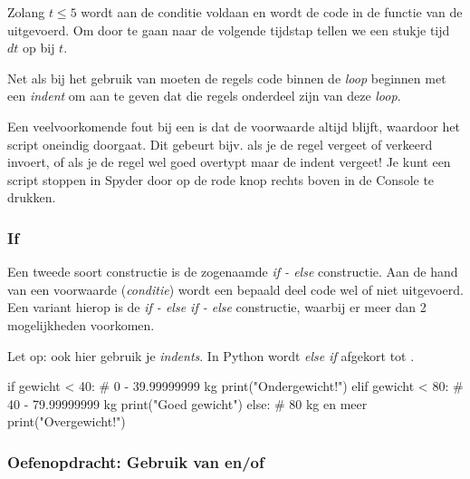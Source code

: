 \documentclass[a4paper,11pt, fleqn]{article}
\begin{document}
Zolang $t\le5$ wordt aan de conditie voldaan en wordt de code in de functie van de  uitgevoerd. Om door te gaan naar de volgende tijdstap tellen we een stukje tijd $dt$ op bij $t$. 

Net als bij het gebruik van  moeten de regels code binnen de  \textit{loop} beginnen met een \textit{indent} om aan te geven dat die regels onderdeel zijn van deze \textit{loop}.

Een veelvoorkomende fout bij een  is dat de voorwaarde altijd  blijft, waardoor het script oneindig doorgaat. Dit gebeurt bijv. als je de regel  vergeet of verkeerd invoert, of als je de regel wel goed overtypt maar de indent vergeet! Je kunt een script stoppen in Spyder door op de rode knop rechts boven in de Console te drukken.

\subsubsection{If}
Een tweede soort constructie is de zogenaamde \textit{if - else} constructie. Aan de hand van een voorwaarde (\textit{conditie}) wordt een bepaald deel code wel of niet uitgevoerd. Een variant hierop is de \textit{if - else if - else} constructie, waarbij er meer dan 2 mogelijkheden voorkomen. 

Let op: ook hier gebruik je \textit{indents}. In Python wordt \textit{else if} afgekort tot . 

\begin{python}
if gewicht < 40:            # 0 - 39.99999999 kg
    print("Ondergewicht!")
elif gewicht < 80:          # 40 - 79.99999999 kg
    print("Goed gewicht")
else:                       # 80 kg en meer
    print("Overgewicht!")
\end{python}


\subsubsection*{Oefenopdracht: Gebruik van  en/of } 
\end{document}
